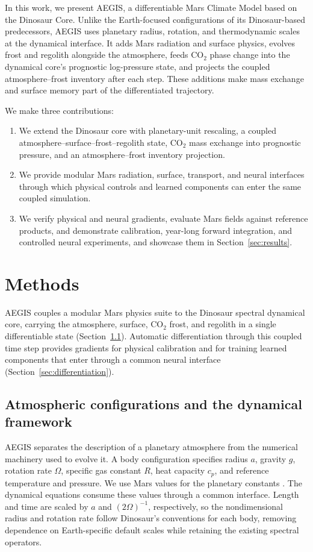 \documentclass{article} %
\newcommand{\co}{CO$_2$}
\begin{document}
In this work, we present AEGIS, a differentiable Mars Climate Model based on the Dinosaur Core. Unlike the Earth-focused configurations of its Dinosaur-based predecessors, AEGIS uses planetary radius, rotation, and thermodynamic scales at the dynamical interface. It adds Mars radiation and surface physics, evolves frost and regolith alongside the atmosphere, feeds \co{} phase change into the dynamical core's prognostic log-pressure state, and projects the coupled atmosphere--frost inventory after each step. These additions make mass exchange and surface memory part of the differentiated trajectory.

We make three contributions:
\begin{enumerate}[leftmargin=*,nosep]
\item We extend the Dinosaur core with planetary-unit rescaling, a coupled atmosphere--surface--frost--regolith state, \co{} mass exchange into prognostic pressure, and an atmosphere--frost inventory projection.
\item We provide modular Mars radiation, surface, transport, and neural interfaces through which physical controls and learned components can enter the same coupled simulation.
\item We verify physical and neural gradients, evaluate Mars fields against reference products, and demonstrate calibration, year-long forward integration, and controlled neural experiments, and showcase them in Section~\ref{sec:results}.
\end{enumerate}

\section{Methods}
AEGIS couples a modular Mars physics suite to the Dinosaur spectral dynamical core, carrying the atmosphere, surface, \co{} frost, and regolith in a single differentiable state (Section~\ref{sec:framework}). Automatic differentiation through this coupled time step provides gradients for physical calibration and for training learned components that enter through a common neural interface (Section~\ref{sec:differentiation}).

 \subsection{Atmospheric configurations and the dynamical framework}\label{sec:framework}

AEGIS separates the description of a planetary atmosphere from the numerical machinery used to evolve it. A body configuration specifies radius $a$, gravity $g$, rotation rate $\Omega$, specific gas constant $R$, heat capacity $c_p$, and reference temperature and pressure. We use Mars values for the planetary constants \citep{nasaMarsFactSheet}. The dynamical equations consume these values through a common interface. Length and time are scaled by $a$ and $(2\Omega)^{-1}$, respectively, so the nondimensional radius and rotation rate follow Dinosaur's conventions for each body, removing dependence on Earth-specific default scales while retaining the existing spectral operators.
\end{document}
